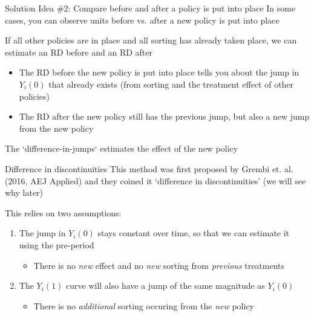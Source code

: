 \documentclass[aspectratio=169,t,11pt,table]{beamer}
\begin{document}
\begin{frame}{Solution Idea \#2: Compare before and after a policy is put into place}
  In some cases, you can observe units before vs. after a new policy is put into place

  \bigskip
  If all other policies are in place and all sorting has already taken place, we can estimate an RD before and an RD after
  \begin{itemize}
    \item The RD before the new policy is put into place tells you about the jump in $Y_i(0)$ that already exists (from sorting and the treatment effect of other policies)
    
    \pause
    \item The RD after the new policy still has the previous jump, but also a new jump from the new policy
  \end{itemize}

  \bigskip
  The `difference-in-jumps` estimates the effect of the new policy
\end{frame}

\begin{frame}{Difference in discontinuities}
  This method was first proposed by Grembi et. al. (2016, AEJ Applied) and they coined it `difference in discontinuities' (we will see why later)

  \bigskip
  This relies on two assumptions:
  \begin{enumerate}
    \item The jump in $Y_i(0)$ stays constant over time, so that we can estimate it using the pre-period
    \begin{itemize}
      \item There is no \emph{new} effect and no \emph{new} sorting from \emph{previous} treatments
    \end{itemize}
    
    \item The $Y_i(1)$ curve will also have a jump of the same magnitude as $Y_i(0)$
    \begin{itemize}
      \item There is no \emph{additional} sorting occuring from the \emph{new} policy
    \end{itemize}
  \end{enumerate}
\end{frame}
\end{document}
